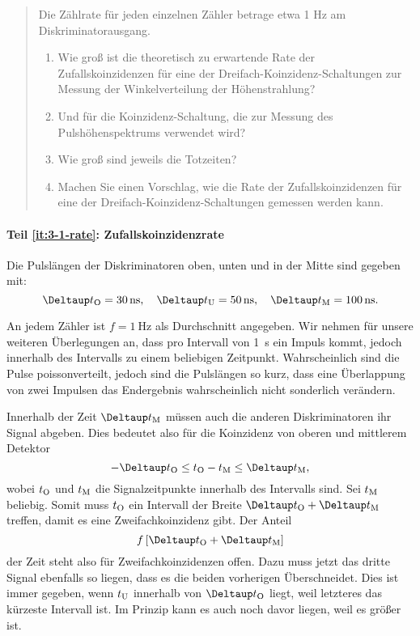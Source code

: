 \documentclass[11pt, ngerman, fleqn, DIV=15, headinclude, BCOR=2cm]{scrreprt}
\begin{document}
\begin{quote}
    Die Zählrate für jeden einzelnen Zähler betrage etwa 1 Hz am
    Diskriminatorausgang.
    \begin{enumerate}
        \item
            \label{it:3-1-rate}
            Wie groß ist die theoretisch zu erwartende Rate der
            Zufallskoinzidenzen für eine der Dreifach-Koinzidenz-Schaltungen
            zur Messung der Winkelverteilung der Höhenstrahlung?

        \item
            \label{it:3-1-puls}
            Und für die Koinzidenz-Schaltung, die zur Messung des
            Pulshöhenspektrums verwendet wird?

        \item
            \label{it:3-1-tot}
            Wie groß sind jeweils die Totzeiten? 

        \item
            \label{it:3-1-vorschlag}
            Machen Sie einen Vorschlag, wie die Rate der Zufallskoinzidenzen
            für eine der Dreifach-Koinzidenz-Schaltungen gemessen werden kann.
    \end{enumerate}
\end{quote}

\paragraph{Teil \ref{it:3-1-rate}: Zufallskoinzidenzrate}

\newcommand\DtM{\Deltaup t_\text M}
\newcommand\DtO{\Deltaup t_\text O}
\newcommand\DtU{\Deltaup t_\text U}

Die Pulslängen der Diskriminatoren oben, unten und in der Mitte sind gegeben
mit:
\[
    \DtO = \SI{30}{\nano\second}
    \eqnsep
    \DtU = \SI{50}{\nano\second}
    \eqnsep
    \DtM = \SI{100}{\nano\second}.
\]

An jedem Zähler ist $f = \SI{1}{\hertz}$ als Durchschnitt angegeben. Wir nehmen
für unsere weiteren Überlegungen an, dass pro Intervall von \SI{1}{\second} ein
Impuls kommt, jedoch innerhalb des Intervalls zu einem beliebigen Zeitpunkt.
Wahrscheinlich sind die Pulse poissonverteilt, jedoch sind die Pulslängen so
kurz, dass eine Überlappung von zwei Impulsen das Endergebnis wahrscheinlich
nicht sonderlich verändern.

Innerhalb der Zeit $\DtM$ müssen auch die anderen Diskriminatoren ihr Signal
abgeben. Dies bedeutet also für die Koinzidenz von oberen und mittlerem
Detektor
\[
    - \DtO \leq t_\text O - t_\text M \leq \DtM,
\]
wobei $t_\text O$ und $t_\text M$ die Signalzeitpunkte innerhalb des Intervalls
sind. Sei $t_\text M$ beliebig. Somit muss $t_\text O$ ein Intervall der Breite
$\DtO + \DtM$ treffen, damit es eine Zweifachkoinzidenz gibt. Der Anteil
\[
    f \sbr{\DtO + \DtM}
\]
der Zeit steht also für Zweifachkoinzidenzen offen. Dazu muss jetzt das dritte
Signal ebenfalls so liegen, dass es die beiden vorherigen Überschneidet. Dies
ist immer gegeben, wenn $t_\text U$ innerhalb von $\DtO$ liegt, weil letzteres
das kürzeste Intervall ist. Im Prinzip kann es auch noch davor liegen, weil es
größer ist.
\end{document}
